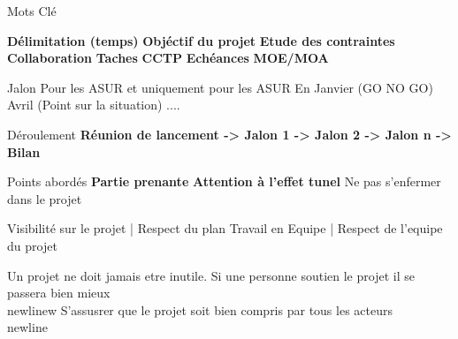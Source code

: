 \documentclass{resume} %
\begin{document}
\begin{rSection}{Mots Clé}

{\bf Délimitation (temps)} \newline  
{\bf Objéctif du projet} \newline
{\bf Etude des contraintes} \newline
{\bf Collaboration} \newline
{\bf Taches} \newline
{\bf CCTP} \newline
{\bf Echéances} \newline
{\bf MOE/MOA}
 
\end{rSection}

\begin{rSection}{Jalon}
 Pour les ASUR et uniquement pour les ASUR \newline 
 En Janvier  (GO NO GO) \newline
 Avril (Point sur la situation) \newline
 ....
 \end{rSection}
 
 
\begin{rSection}{Déroulement}
{\bf Réunion de lancement  -> Jalon 1 -> Jalon 2 -> Jalon n -> Bilan}

\end{rSection}

\begin{rSection}{Points abordés}
{\bf Partie prenante}\newline
{\bf Attention à l'effet tunel} \newline
Ne pas s'enfermer dans le projet

    Visibilité sur le projet | Respect du plan  \newline
     Travail en Equipe | Respect de l'equipe du projet \newline







Un projet ne doit jamais etre inutile. Si une personne soutien le projet il se passera bien mieux\\newlinew
S'assusrer que le projet soit bien compris par tous les acteurs\\newline



\end{rSection}
\end{document}
